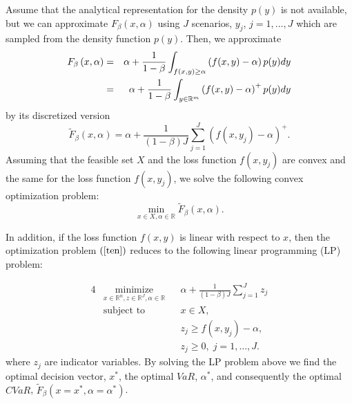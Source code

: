 \documentclass[a4paper,12pt]{report}
\begin{document}
\begin{refsection}
Assume that the analytical representation for the density $p(y)$ is not
available, but we can approximate $F_{\beta }\left( x,\alpha \right) $ using
$J$ scenarios, $y_{j}$, $j=1,...,J$ which are sampled from the density
function $p(y)$. Then, we approximate
\begin{eqnarray}
F_{\beta }\left( x,\alpha \right) &=&\alpha +\frac{1}{1-\beta }%
\int_{f(x,y)\geq \alpha }\left( f(x,y)-\alpha \right) p(y)dy  \notag \\
&=&\alpha +\frac{1}{1-\beta }\int_{y\in
	\mathbb{R}
	^{m}}\left( f(x,y)-\alpha \right) ^{+}p(y)dy  \label{fb}
\end{eqnarray}%
by its discretized version
\begin{equation*}
\widetilde{F}_{\beta }\left( x,\alpha \right) =\alpha +\frac{1}{\left(
	1-\beta \right) J}\sum_{j=1}^{J}\left( f(x,y_{j})-\alpha \right) ^{+}.
\end{equation*}%
Assuming that the feasible set $X$ and the loss
function $f(x,y_{j})$ are convex and the same for the loss
function $f(x,y_{j})$, we solve the following convex optimization problem:
\begin{equation}
\underset{x\in X,\alpha \in
	\mathbb{R}
}{\min }\widetilde{F}_{\beta }\left( x,\alpha \right) .  \label{ten}
\end{equation}

In addition, if the loss function $f(x,y)$ is linear with respect to
\thinspace $x$, then the optimization problem $\left( \ref{ten}\right) $
reduces to the following linear programming (LP) problem:%

\begin{alignat}{4}
& \underset{x \in \mathbb{R}^{n},z\in 	\mathbb{R}^{J},\alpha \in \mathbb{R}}{\text{minimize}}
& & \alpha +\frac{1}{\left( 1-\beta \right)  J}\sum_{j=1}^{J}z_{j}
\\ 
& \text{subject to} 
& & x\in X,\\
&&& z_{j}\geq f(x,y_{j})-\alpha , \\
&&& z_{j}\geq 0, \; j = 1, \ldots, J.
\end{alignat}
where $z_{j}$ are indicator variables. By solving the LP problem above we
find the optimal decision vector, $x^{\ast }$, the optimal $VaR$, $\alpha
^{\ast }$, and consequently the optimal $CVaR$, $\widetilde{F}_{\beta
}\left( x=x^{\ast },\alpha=\alpha ^{\ast }\right) $.


\end{refsection}
\end{document}
